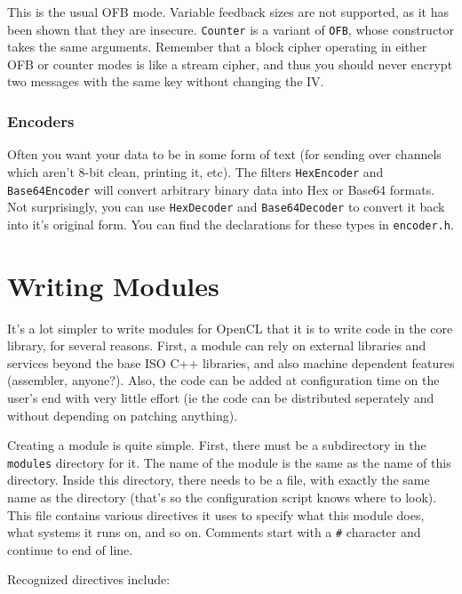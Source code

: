 \documentclass{article}
\newcommand{\filename}[1]{\texttt{#1}}
\newcommand{\type}[1]{\texttt{#1}}
\begin{document}
\vskip 5pt
This is the usual OFB mode. Variable feedback sizes are not supported, as it
has been shown that they are insecure. \type{Counter} is a variant of
\type{OFB}, whose constructor takes the same arguments. Remember that a block
cipher operating in either OFB or counter modes is like a stream cipher, and
thus you should never encrypt two messages with the same key without changing
the IV.

\subsubsection{Encoders}

Often you want your data to be in some form of text (for sending over channels
which aren't 8-bit clean, printing it, etc). The filters \type{HexEncoder} and
\type{Base64Encoder} will convert arbitrary binary data into Hex or Base64
formats. Not surprisingly, you can use \type{HexDecoder} and
\type{Base64Decoder} to convert it back into it's original form. You can find
the declarations for these types in \filename{encoder.h}.

\pagebreak

\section{Writing Modules}

It's a lot simpler to write modules for OpenCL that it is to write code in the
core library, for several reasons. First, a module can rely on external
libraries and services beyond the base ISO C++ libraries, and also machine
dependent features (assembler, anyone?). Also, the code can be added at
configuration time on the user's end with very little effort (ie the code
can be distributed seperately and without depending on patching anything).

Creating a module is quite simple. First, there must be a subdirectory in the
\filename{modules} directory for it. The name of the module is the same as the
name of this directory. Inside this directory, there needs to be a file, with
exactly the same name as the directory (that's so the configuration script
knows where to look). This file contains various directives it uses to specify
what this module does, what systems it runs on, and so on. Comments start with
a \verb|#| character and continue to end of line.

Recognized directives include:

\newcommand{\directive}[2]{
   \vskip 4pt
   \noindent
   \texttt{#1}: #2
}
\end{document}
